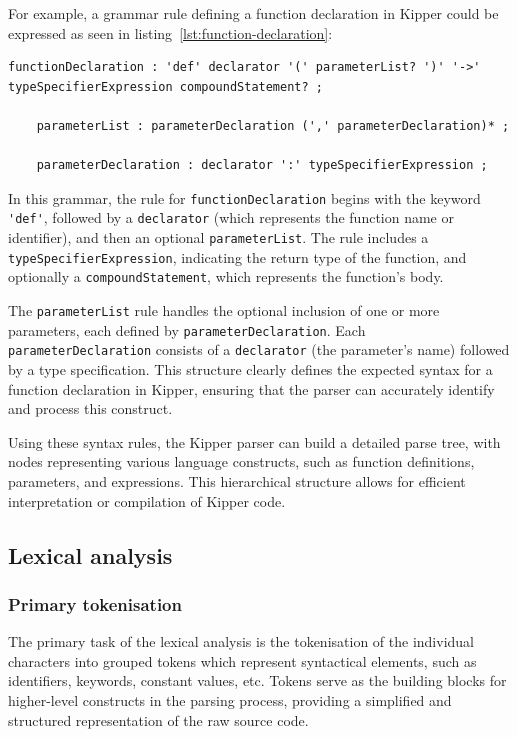 For example, a grammar rule defining a function declaration in Kipper could be expressed as seen in listing~\ref{lst:function-declaration}:

\begin{lstlisting}[language=antlr4, caption={Function Declaration Grammar}, label={lst:function-declaration}]
	functionDeclaration : 'def' declarator '(' parameterList? ')' '->' typeSpecifierExpression compoundStatement? ;
	
	parameterList : parameterDeclaration (',' parameterDeclaration)* ;
	
	parameterDeclaration : declarator ':' typeSpecifierExpression ;
\end{lstlisting}

In this grammar, the rule for \lstinline|functionDeclaration| begins with the keyword \lstinline|'def'|, followed by a \lstinline|declarator| (which represents the function name or identifier), and then an optional \lstinline|parameterList|. The rule includes a \lstinline|typeSpecifierExpression|, indicating the return type of the function, and optionally a \lstinline|compoundStatement|, which represents the function's body.

The \lstinline|parameterList| rule handles the optional inclusion of one or more parameters, each defined by \lstinline|parameterDeclaration|. Each \lstinline|parameterDeclaration| consists of a \lstinline|declarator| (the parameter's name) followed by a type specification. This structure clearly defines the expected syntax for a function declaration in Kipper, ensuring that the parser can accurately identify and process this construct.

Using these syntax rules, the Kipper parser can build a detailed parse tree, with nodes representing various language constructs, such as function definitions, parameters, and expressions. This hierarchical structure allows for efficient interpretation or compilation of Kipper code.

\subsection{Lexical analysis}

\subsubsection{Primary tokenisation}

The primary task of the lexical analysis is the tokenisation of the individual characters into grouped tokens which represent syntactical elements, such as identifiers, keywords, constant values, etc. Tokens serve as the building blocks for higher-level constructs in the parsing process, providing a simplified and structured representation of the raw source code.

